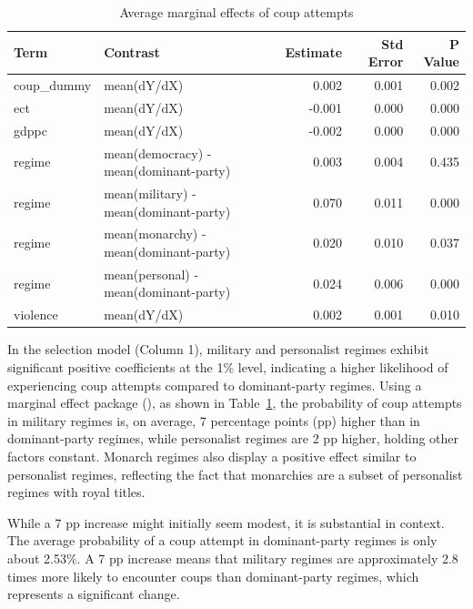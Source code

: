 \documentclass[
  12pt,
]{report}
\begin{document}
\begin{longtable}{@{\extracolsep{\fill}}llrrr}

\caption{\label{tbl-mfx}Average marginal effects of coup attempts}

\tabularnewline

\toprule
Term & Contrast & Estimate & Std Error & P Value \\ 
\midrule\addlinespace[2.5pt]
coup\_dummy & mean(dY/dX) & 0.002 & 0.001 & 0.002 \\ 
ect & mean(dY/dX) & -0.001 & 0.000 & 0.000 \\ 
gdppc & mean(dY/dX) & -0.002 & 0.000 & 0.000 \\ 
regime & mean(democracy) - mean(dominant-party) & 0.003 & 0.004 & 0.435 \\ 
regime & mean(military) - mean(dominant-party) & 0.070 & 0.011 & 0.000 \\ 
regime & mean(monarchy) - mean(dominant-party) & 0.020 & 0.010 & 0.037 \\ 
regime & mean(personal) - mean(dominant-party) & 0.024 & 0.006 & 0.000 \\ 
violence & mean(dY/dX) & 0.002 & 0.001 & 0.010 \\ 
\bottomrule

\end{longtable}

\endgroup

In the selection model (Column 1), military and personalist regimes
exhibit significant positive coefficients at the 1\% level, indicating a
higher likelihood of experiencing coup attempts compared to
dominant-party regimes. Using a marginal effect package
(),
as shown in Table~\ref{tbl-mfx}, the probability of coup attempts in
military regimes is, on average, 7 percentage points (pp) higher than in
dominant-party regimes, while personalist regimes are 2 pp higher,
holding other factors constant. Monarch regimes also display a positive
effect similar to personalist regimes, reflecting the fact that
monarchies are a subset of personalist regimes with royal titles.

While a 7 pp increase might initially seem modest, it is substantial in
context. The average probability of a coup attempt in dominant-party
regimes is only about 2.53\%. A 7 pp increase means that military
regimes are approximately 2.8 times more likely to encounter coups than
dominant-party regimes, which represents a significant change.
\end{document}
